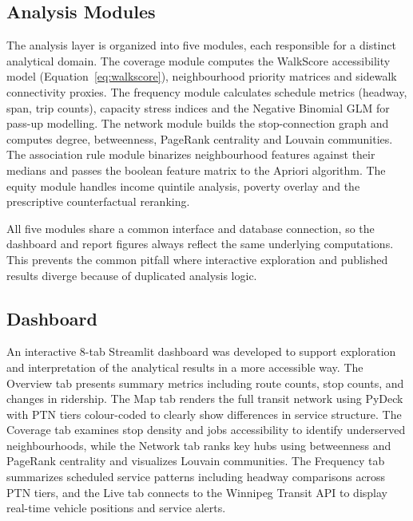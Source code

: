 \documentclass[11pt]{article}
\begin{document}
\subsection{Analysis Modules}

The analysis layer is organized into five modules, each responsible for a distinct analytical domain. The coverage module computes the WalkScore accessibility model (Equation~\ref{eq:walkscore}), neighbourhood priority matrices and sidewalk connectivity proxies. The frequency module calculates schedule metrics (headway, span, trip counts), capacity stress indices and the Negative Binomial GLM for pass-up modelling. The network module builds the stop-connection graph and computes degree, betweenness, PageRank centrality and Louvain communities. The association rule module binarizes neighbourhood features against their medians and passes the boolean feature matrix to the Apriori algorithm. The equity module handles income quintile analysis, poverty overlay and the prescriptive counterfactual reranking.

All five modules share a common interface and database connection, so the dashboard and report figures always reflect the same underlying computations. This prevents the common pitfall where interactive exploration and published results diverge because of duplicated analysis logic.

\subsection{Dashboard}

An interactive 8-tab Streamlit dashboard was developed to support exploration and interpretation of the analytical results in a more accessible way. The Overview tab presents summary metrics including route counts, stop counts, and changes in ridership. The Map tab renders the full transit network using PyDeck with PTN tiers colour-coded to clearly show differences in service structure. The Coverage tab examines stop density and jobs accessibility to identify underserved neighbourhoods, while the Network tab ranks key hubs using betweenness and PageRank centrality and visualizes Louvain communities. The Frequency tab summarizes scheduled service patterns including headway comparisons across PTN tiers, and the Live tab connects to the Winnipeg Transit API to display real-time vehicle positions and service alerts.
\end{document}
